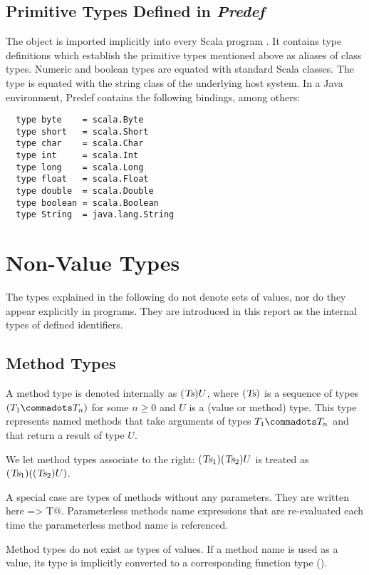 \subsection{Primitive Types Defined in {\em Predef}}

The object \lstinline@Predef@ is imported implicitly into every Scala
program . It contains type definitions which establish the primitive
types mentioned above as aliases of class types. Numeric and boolean
types are equated with standard Scala classes. The \lstinline@String@
type is equated with the string class of the underlying host
system. In a Java environment, Predef contains the following bindings,
among others:
\begin{lstlisting}
  type byte    = scala.Byte
  type short   = scala.Short
  type char    = scala.Char
  type int     = scala.Int
  type long    = scala.Long
  type float   = scala.Float
  type double  = scala.Double
  type boolean = scala.Boolean
  type String  = java.lang.String
\end{lstlisting}


\section{Non-Value Types}
\label{sec:synthetic-types}

The types explained in the following do not denote sets of values, nor
do they appear explicitly in programs. They are introduced in this
report as the internal types of defined identifiers.

\subsection{Method Types}
\label{sec:method-types}

A method type is denoted internally as $(\mbox{\sl Ts})U$, where $(\mbox{\sl Ts})$ is a
sequence of types $(T_1 \commadots T_n)$ for some $n \geq 0$
and $U$ is a (value or method) type.  This type represents named
methods that take arguments of types $T_1 \commadots T_n$ 
and that return a result of type $U$.

We let method types associate to the right: $(\mbox{\sl Ts}_1)(\mbox{\sl Ts}_2)U$ is
treated as $(\mbox{\sl Ts}_1)((\mbox{\sl Ts}_2)U)$.

A special case are types of methods without any parameters. They are
written here \lstinline@=> T@. Parameterless methods name expressions
that are re-evaluated each time the parameterless method name is
referenced.

Method types do not exist as types of values. If a method name is used
as a value, its type is implicitly converted to a corresponding
function type ().

